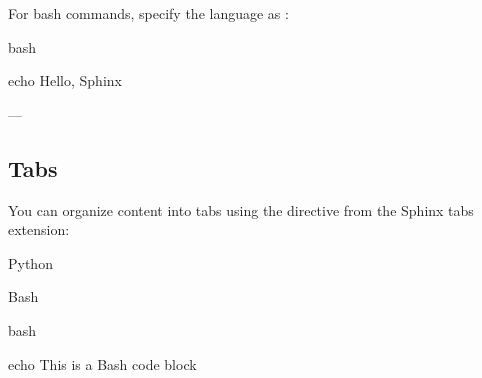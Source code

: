 \documentclass[a4paper,10pt,english]{sphinxmanual}
\begin{document}
\begin{sphinxVerbatim}[commandchars=\\\{\}]
 
\end{sphinxVerbatim}

\sphinxAtStartPar
For bash commands, specify the language as :

\begin{sphinxVerbatim}[commandchars=\\\{\}]
  bash

    echo \PYGZdq{}Hello, Sphinx\PYGZdq{}
\end{sphinxVerbatim}

\begin{sphinxVerbatim}[commandchars=\\\{\}]
\end{sphinxVerbatim}

\sphinxAtStartPar
—


\subsection{Tabs}
\label{\detokenize{page_two:tabs}}
\sphinxAtStartPar
You can organize content into tabs using the  directive from the Sphinx tabs extension:

\begin{sphinxVerbatim}[commandchars=\\\{\}]
 

  Python

  

             
                 

  Bash

  bash

            echo \PYGZdq{}This is a Bash code block\PYGZdq{}
\end{sphinxVerbatim}
\end{document}
